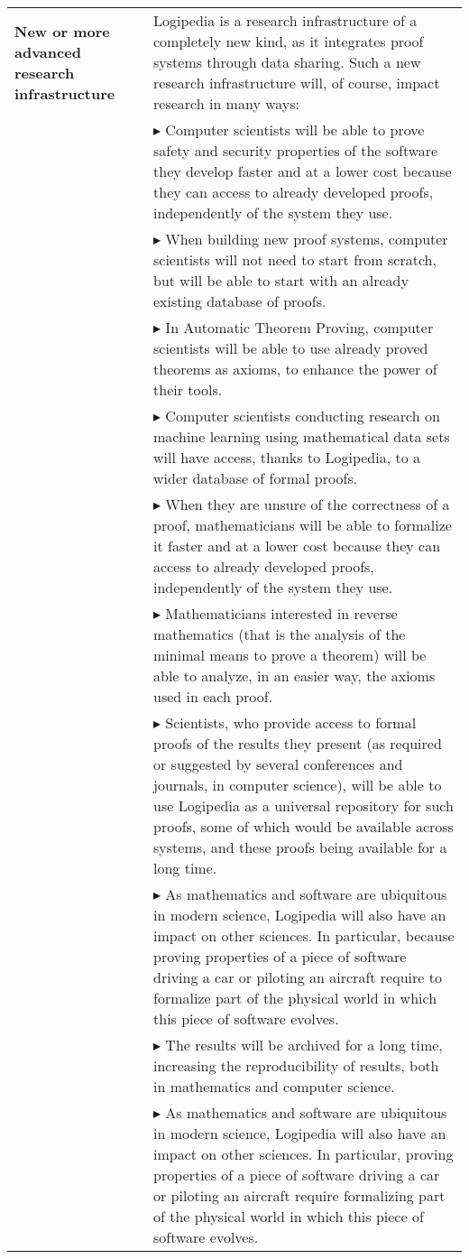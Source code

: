 \begin{longtable}{|p{}|p{}|}
\hline
{\bf New or more advanced research infrastructure}
&
Logipedia is a research
infrastructure of a completely new kind, as it integrates proof systems
through data sharing. Such a new research infrastructure will, of
course, impact research in many ways:
\\
&
$\blacktriangleright$ Computer scientists
will be able to prove safety and security
  properties of the software they develop faster and at a lower cost
  because they can access to already developed proofs, independently
  of the system they use.
\\
&
$\blacktriangleright$ When building new proof systems, computer scientists will not
  need to start from scratch, but will be able to start with an already
  existing database of proofs.
\\
&
$\blacktriangleright$ In Automatic Theorem Proving, computer scientists will be able
  to use already proved theorems as axioms, to enhance the power of
  their tools.
\\
&
$\blacktriangleright$ Computer scientists conducting research on machine learning
using mathematical data sets will have access, thanks to Logipedia,
to a wider database of formal proofs.
\\
&
$\blacktriangleright$ When they are unsure of the correctness of a proof,
  mathematicians will be able to formalize it faster and at a lower
  cost because they can access to already developed proofs,
  independently of the system they use.
\\
&
$\blacktriangleright$
Mathematicians interested in reverse mathematics (that is the analysis
of the minimal means to prove a theorem) will be able to analyze, in
an easier way, the axioms used in each proof.
\\
&

$\blacktriangleright$ Scientists, who provide access
  to formal proofs of the results they present (as required or
  suggested by several conferences and journals, in computer science), 
  will be able to
  use Logipedia as a universal repository for such proofs, some of
  which would be available across systems, and these proofs being
  available for a long time.
\\
&
$\blacktriangleright$ As mathematics and software are ubiquitous in 
  modern science, Logipedia will also have an impact on other sciences. 
  In particular, because proving properties of a piece of software driving 
  a car or piloting an aircraft require to formalize part of the physical 
  world in which this piece of software evolves.
\\
& 
$\blacktriangleright$ The results will be archived for a long time, increasing the
  reproducibility of results, both in mathematics and computer science.
\\
&
$\blacktriangleright$ As mathematics and software are ubiquitous in modern science,
  Logipedia will also have an impact on other sciences. In
  particular, proving properties of a piece of software driving
  a car or piloting an aircraft require formalizing part of the
  physical world in which this piece of software evolves.


\end{longtable}
